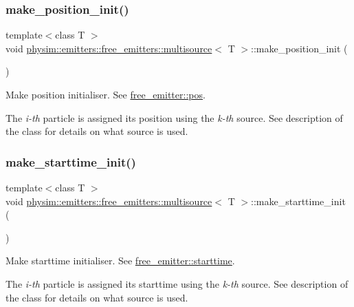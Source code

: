 \subsubsection{\texorpdfstring{make\+\_\+position\+\_\+init()}{make\_position\_init()}}
{\footnotesize\ttfamily template$<$class T $>$ \\
void \hyperlink{classphysim_1_1emitters_1_1free__emitters_1_1multisource}{physim\+::emitters\+::free\+\_\+emitters\+::multisource}$<$ T $>$\+::make\+\_\+position\+\_\+init (\begin{DoxyParamCaption}{ }\end{DoxyParamCaption})}



Make position initialiser. See \hyperlink{classphysim_1_1emitters_1_1base__emitter_ac67584a2ca34232c1f4f04c41599df0e}{free\+\_\+emitter\+::pos}. 

The {\itshape i-\/th} particle is assigned its position using the {\itshape k-\/th} source. See description of the class for details on what source is used. \mbox{\label{classphysim_1_1emitters_1_1free__emitters_1_1multisource_a2e750255e30d76c1e6ef69dec8e01d3b}} 
\subsubsection{\texorpdfstring{make\+\_\+starttime\+\_\+init()}{make\_starttime\_init()}}
{\footnotesize\ttfamily template$<$class T $>$ \\
void \hyperlink{classphysim_1_1emitters_1_1free__emitters_1_1multisource}{physim\+::emitters\+::free\+\_\+emitters\+::multisource}$<$ T $>$\+::make\+\_\+starttime\+\_\+init (\begin{DoxyParamCaption}{ }\end{DoxyParamCaption})}



Make starttime initialiser. See \hyperlink{classphysim_1_1emitters_1_1free__emitter_af296f735438087c4acaba2242c839e49}{free\+\_\+emitter\+::starttime}. 

The {\itshape i-\/th} particle is assigned its starttime using the {\itshape k-\/th} source. See description of the class for details on what source is used. \mbox{\label{classphysim_1_1emitters_1_1free__emitters_1_1multisource_a638cc70a85d14ec5cc836f4b58611a3a}} 
